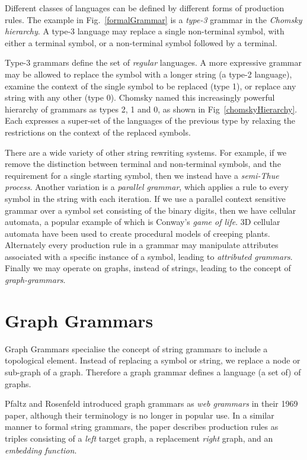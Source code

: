 Different classes of languages can be defined by different forms of production rules. The example in Fig.~\ref{formalGrammar} is a \emph{type-3} grammar in the \emph{Chomsky hierarchy}. A type-3 language may replace a single non-terminal symbol, with either a terminal symbol, or a non-terminal symbol followed by a terminal. 

Type-3 grammars define the set of \emph{regular} languages. A more expressive grammar may be allowed to replace the symbol with a longer string (a type-2 language), examine the context of the single symbol to be replaced (type 1), or replace any string with any other (type 0). Chomsky named this increasingly powerful hierarchy of grammars as types 2, 1 and 0, as shown in Fig~\ref{chomskyHierarchy}. Each expresses a super-set of the languages of the previous type by relaxing the restrictions on the context of the replaced symbols.

There are a wide variety of other string rewriting systems\cite{Klop03}. For example, if we remove the distinction between terminal and non-terminal symbols, and the requirement for a single starting symbol, then we instead have a \emph{semi-Thue process}\cite{Davis94}. Another variation is a \emph{parallel grammar}, which applies a rule to every symbol in the string with each iteration. If we use a parallel context sensitive grammar over a symbol set consisting of the binary digits, then we have cellular automata\cite{Wolfram83}, a popular example of which is Conway's \emph{game of life}\cite{ConwaysLife}. 3D cellular automata have been used to create procedural models of creeping plants\cite{Greene89}. Alternately every production rule in a grammar may manipulate attributes associated with a specific instance of a symbol, leading to \emph{attributed grammars}\cite{Knuth68}. Finally we may operate on graphs, instead of strings, leading to the concept of \emph{graph-grammars}.

\section{Graph Grammars}
\label{s:ggrammars}

Graph Grammars specialise the concept of string grammars to include a topological element. Instead of replacing a symbol or string, we replace a node or sub-graph of a graph. Therefore a graph grammar defines a language (a set of) of graphs.

Pfaltz and Rosenfeld introduced graph grammars as \emph{web grammars} in their 1969 paper\cite{Pfaltz69}, although their terminology is no longer in popular use. In a similar manner to formal string grammars, the paper describes production rules as triples consisting of a \emph{left} target graph, a replacement \emph{right} graph, and an \emph{embedding function}.

